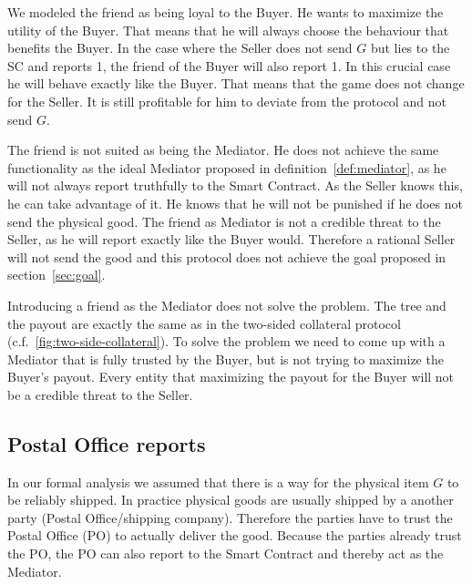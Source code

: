 \documentclass{cacthesis}
\begin{document}
We modeled the friend as being loyal to the Buyer. He wants to maximize the utility of the Buyer.
That means that he will always choose the behaviour that benefits the Buyer. In the case where the Seller does not send $G$ but lies to the SC and reports 1, the friend of the Buyer will also report 1. In this crucial case he will behave exactly like the Buyer. That means that the game does not change for the Seller. It is still profitable for him to deviate from the protocol and not send $G$.\newline

The friend is not suited as being the Mediator. He does not achieve the same functionality as the ideal Mediator proposed in definition~\ref{def:mediator}, as he will not always report truthfully to the Smart Contract. As the Seller knows this, he can take advantage of it. He knows that he will not be punished if he does not send the physical good. The friend as Mediator is not a credible threat to the Seller, as he will report exactly like the Buyer would. Therefore a rational Seller will not send the good and this protocol does not achieve the goal proposed in section~\ref{sec:goal}.\newline

Introducing a friend as the Mediator does not solve the problem. The tree and
the payout are exactly the same as in the two-sided collateral protocol (c.f.~\ref{fig:two-side-collateral}).
To solve the problem we need to come up with a Mediator that is fully trusted by
the Buyer, but is not trying to maximize the Buyer's payout.
Every entity that maximizing the payout for the Buyer will not be a
credible threat to the Seller.


\subsection{Postal Office reports}
\label{sec:postaloffice}
In our formal analysis we assumed that there is a way for the physical item $G$ to be reliably shipped. In practice physical goods are usually shipped by a another party (Postal Office/shipping company).
Therefore the parties have to trust the Postal Office (PO) to actually deliver the good. Because the parties already trust the PO, the PO can also report to the Smart Contract and thereby act as the Mediator.\newline
\end{document}
